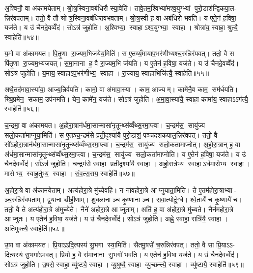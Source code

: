 अ॒श्विनौ॒ वा अ॑कामयेताम्। श्रो॒त्र॒स्विना॒वब॑धिरौ स्या॒वेति॑। तावे॒तम॒श्विभ्या॑मश्व॒युग्भ्यां पुरो॒डाश॑न्द्विकपा॒ल- न्निर॑वपताम्। ततो॒ वै तौ श्रोत्र॒स्विना॒वब॑धिरावभवताम्। श्रो॒त्र॒स्वी ह॒ वा अब॑धिरो भवति। य एते॒न॑ ह॒विषा॒ यज॑ते। य उ॑ चैनदे॒वव्वेँद॑। सोऽत्र॑ जुहोति। अ॒श्विभ्या॒ स्वाहाऽश्व॒युग्भ्या॒ स्वाहा। श्रोत्रा॑य॒ स्वाहा॒ श्रुत्यै॒ स्वाहेति॑॥५४॥

य॒मो वा अ॑कामयत। पि॒तृ॒णा रा॒ज्यम॒भिज॑येय॒मिति॑। स ए॒तय्यँ॒माया॑प॒भर॑णीभ्यश्च॒रुन्निर॑पवत्। ततो॒ वै स पि॑तृ॒णा रा॒ज्यम॒भ्य॑जयत्। स॒मा॒नाना ह॒ वै रा॒ज्यम॒भि ज॑यति। य ए॒तेन॑ ह॒विषा॒ यज॑ते। य उ॑ चैनदे॒वव्वेँद॑। सोऽत्र॑ जुहोति। य॒माय॒ स्वाहा॑ऽप॒भर॑णीभ्य॒ स्वाहा। रा॒ज्याय॒ स्वाहा॒भिजि॑त्यै॒ स्वाहेति॑॥५५॥

अथै॒तद॑मावा॒स्या॑या॒ आज्य॒न्निर्व॑पति। कामो॒ वा अ॑मावा॒स्या। काम॒ आज्यम्। कामे॑नै॒व काम॒ सम॑र्धयति। ख्षि॒प्रमे॑न॒ सकाम॒ उप॑नमति। येन॒ कामे॑न॒ यज॑ते। सोऽत्र॑ जुहोति। अ॒मा॒वा॒स्या॑यै॒ स्वाहा॒ कामा॑य॒ स्वाहाऽऽग॑त्यै॒ स्वाहेति॑॥५६॥\anuvakamend[मि॒त्र इन्द्र॑ प्र॒जाप॑ति॒र्दश॑ द॒शाप॒ एका॑दश॒ विश्वे॒ ब्रह्म॒ दश॑दश॒ विष्णु॒स्त्रयो॑दश॒ वस॑व॒ इन्द्रो॒ऽजोऽहि॒र्वै बु॒ध्निय॑ पू॒षाऽश्विनौ॑ य॒मो दश॑ द॒शाथै॒तद॑मावा॒स्या॑या अ॒ष्टौ पञ्च॑दश]

च॒न्द्रमा॒ वा अ॑कामयत। अ॒होरा॒त्रान॑र्धमा॒सान्मासा॑नृ॒तून्थ्स॑व्वँथ्स॒रमा॒प्त्वा। च॒न्द्रम॑स॒ सायु॑ज्य सलो॒कता॑माप्नुया॒मिति॑। स ए॒तञ्च॒न्द्रम॑से प्रती॒दृश्या॑यै पुरो॒डाशं॒ पञ्च॑दशकपाल॒न्निर॑वपत्। ततो॒ वै सो॑ऽहोरा॒त्रान॑र्धमा॒सान्मासा॑नृ॒तून्थ्स॑व्वँथ्स॒रमा॒प्त्वा। च॒न्द्रम॑स॒ सायु॑ज्य सलो॒कता॑माप्नोत्। अ॒हो॒रा॒त्रान् ह॒ वा अ॑र्धमा॒सान्मासा॑नृ॒तून्थ्स॑व्वँथ्स॒रमा॒प्त्वा। च॒न्द्रम॑स॒ सायु॑ज्य सलो॒कता॑माप्नोति। य ए॒तेन॑ ह॒विषा॒ यज॑ते। य उ॑ चैनदे॒वव्वेँद॑। सोऽत्र॑ जुहोति। च॒न्द्रम॑से॒ स्वाहा प्रती॒दृश्या॑यै॒ स्वाहा। अ॒हो॒रा॒त्रेभ्य॒ स्वाहाऽर्धमा॒सेभ्य॒ स्वाहा। मासेभ्य॒ स्वाह॒र्तुभ्य॒ स्वाहा। सं॒व॒त्स॒राय॒ स्वाहेति॑॥५७॥

अ॒हो॒रा॒त्रे वा अ॑कामयेताम्। अत्य॑होरा॒त्रे मु॑च्येवहि। न ना॑वहोरा॒त्रे आप्नुयाता॒मिति॑। ते ए॒तम॑होरा॒त्राभ्या- ञ्च॒रुन्निर॑वपताम्। द्व॒यानाव्व्रीँही॒णाम्। शु॒क्लानाञ्च कृ॒ष्णानाञ्च। स॒वा॒त्योर्दु॒ग्धे। श्वे॒तायै॑ च कृ॒ष्णायै॑ च। ततो॒ वै ते अत्य॑होरा॒त्रे अ॑मुच्येते। नैने॑ अहोरा॒त्रे आप्नुताम्। अति॑ ह॒ वा अ॑होरा॒त्रे मु॑च्यते। नैन॑महोरा॒त्रे आप्नुतः। य ए॒तेन॑ ह॒विषा॒ यज॑ते। य उ॑ चैनदे॒वव्वेँद॑। सोऽत्र॑ जुहोति। अह्ने॒ स्वाहा॒ रात्रि॑यै॒ स्वाहा। अति॑मुक्त्यै॒ स्वाहेति॑॥५८॥

उ॒षा वा अ॑कामयत। प्रि॒याऽऽदि॒त्यस्य॑ सु॒भगा स्या॒मिति॑। सैतमु॒षसे॑ च॒रुन्निर॑वपत्। ततो॒ वै सा प्रि॒याऽऽ- दि॒त्यस्य॑ सु॒भगा॑ऽभवत्। प्रि॒यो ह॒ वै स॑मा॒नाना सु॒भगो॑ भवति। य ए॒तेन॑ ह॒विषा॒ यज॑ते। य उ॑ चैनदे॒वव्वेँद॑। सोऽत्र॑ जुहोति। उ॒षसे॒ स्वाहा॒ व्यु॑ष्ट्यै॒ स्वाहा। व्यू॒षुष्यै॒ स्वाहा व्यु॒च्छन्त्यै॒ स्वाहा। व्यु॑ष्टायै॒ स्वाहेति॑॥५९॥

